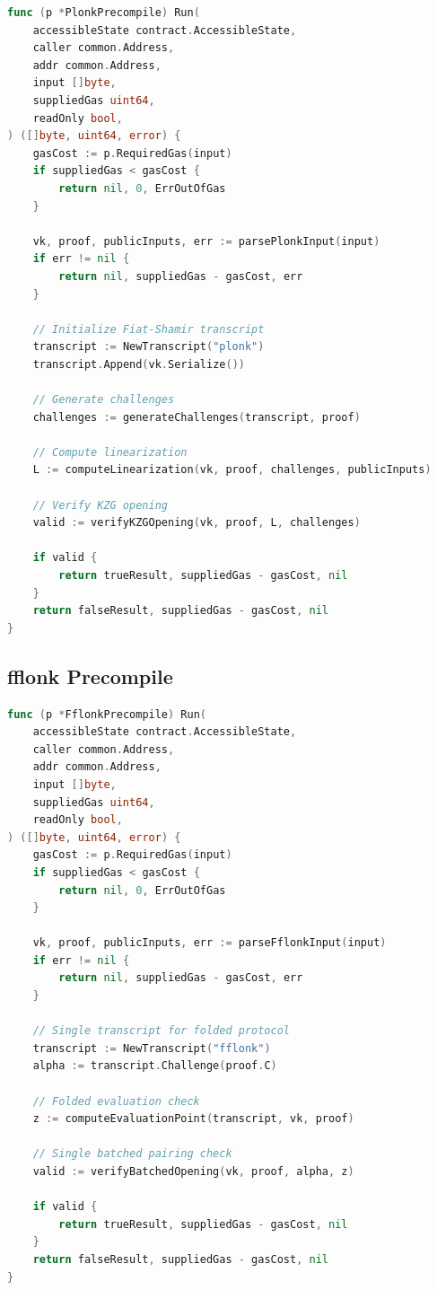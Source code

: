 \documentclass[11pt,a4paper]{article}
\theoremstyle{definition}
\begin{document}
\begin{lstlisting}[language=Go, caption={PLONK Verification Entry Point}]
func (p *PlonkPrecompile) Run(
    accessibleState contract.AccessibleState,
    caller common.Address,
    addr common.Address,
    input []byte,
    suppliedGas uint64,
    readOnly bool,
) ([]byte, uint64, error) {
    gasCost := p.RequiredGas(input)
    if suppliedGas < gasCost {
        return nil, 0, ErrOutOfGas
    }

    vk, proof, publicInputs, err := parsePlonkInput(input)
    if err != nil {
        return nil, suppliedGas - gasCost, err
    }

    // Initialize Fiat-Shamir transcript
    transcript := NewTranscript("plonk")
    transcript.Append(vk.Serialize())

    // Generate challenges
    challenges := generateChallenges(transcript, proof)

    // Compute linearization
    L := computeLinearization(vk, proof, challenges, publicInputs)

    // Verify KZG opening
    valid := verifyKZGOpening(vk, proof, L, challenges)

    if valid {
        return trueResult, suppliedGas - gasCost, nil
    }
    return falseResult, suppliedGas - gasCost, nil
}
\end{lstlisting}

\subsection{fflonk Precompile}

\begin{lstlisting}[language=Go, caption={fflonk Verification Entry Point}]
func (p *FflonkPrecompile) Run(
    accessibleState contract.AccessibleState,
    caller common.Address,
    addr common.Address,
    input []byte,
    suppliedGas uint64,
    readOnly bool,
) ([]byte, uint64, error) {
    gasCost := p.RequiredGas(input)
    if suppliedGas < gasCost {
        return nil, 0, ErrOutOfGas
    }

    vk, proof, publicInputs, err := parseFflonkInput(input)
    if err != nil {
        return nil, suppliedGas - gasCost, err
    }

    // Single transcript for folded protocol
    transcript := NewTranscript("fflonk")
    alpha := transcript.Challenge(proof.C)

    // Folded evaluation check
    z := computeEvaluationPoint(transcript, vk, proof)

    // Single batched pairing check
    valid := verifyBatchedOpening(vk, proof, alpha, z)

    if valid {
        return trueResult, suppliedGas - gasCost, nil
    }
    return falseResult, suppliedGas - gasCost, nil
}
\end{lstlisting}
\end{document}
